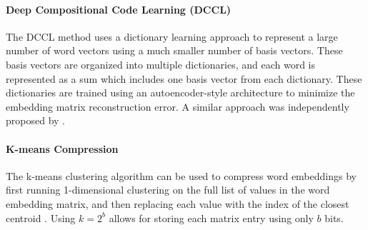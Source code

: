 \paragraph{Deep Compositional Code Learning (DCCL)} 
The DCCL method \citep{dccl17} uses a dictionary learning approach to represent a large number of word vectors using a much smaller number of basis vectors.
These basis vectors are organized into multiple dictionaries, and each word is represented as a sum which includes one basis vector from each dictionary.
These dictionaries are trained using an autoencoder-style architecture to minimize the embedding matrix reconstruction error.
A similar approach was independently proposed by \citet{kway18}.

\paragraph{K-means Compression}
The k-means clustering algorithm can be used to compress word embeddings by first running 1-dimensional clustering on the full list of values in the word embedding matrix, and then replacing each value with the index of the closest centroid \citep{andrews16}.
Using $k=2^b$ allows for storing each matrix entry using only $b$ bits.


